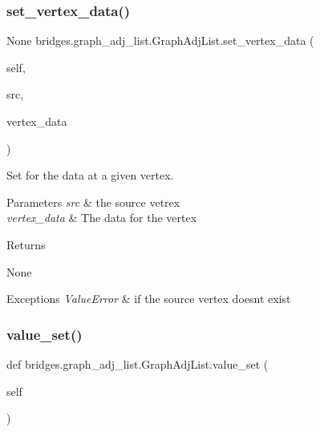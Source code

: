 \subsubsection{\texorpdfstring{set\_vertex\_data()}{set\_vertex\_data()}}
{\footnotesize\ttfamily  None bridges.\+graph\+\_\+adj\+\_\+list.\+Graph\+Adj\+List.\+set\+\_\+vertex\+\_\+data (\begin{DoxyParamCaption}\item[{}]{self,  }\item[{}]{src,  }\item[{}]{vertex\+\_\+data }\end{DoxyParamCaption})}



Set for the data at a given vertex. 


\begin{DoxyParams}{Parameters}
{\em src} & the source vetrex \\
\hline
{\em vertex\+\_\+data} & The data for the vertex \\
\hline
\end{DoxyParams}
\begin{DoxyReturn}{Returns}


None
\end{DoxyReturn}

\begin{DoxyExceptions}{Exceptions}
{\em Value\+Error} & if the source vertex doesnt exist \\
\hline
\end{DoxyExceptions}
\mbox{\label{classbridges_1_1graph__adj__list_1_1_graph_adj_list_ae12db7b48cf37ba8d2852fa05ebaa2c0}} 
\subsubsection{\texorpdfstring{value\_set()}{value\_set()}}
{\footnotesize\ttfamily def bridges.\+graph\+\_\+adj\+\_\+list.\+Graph\+Adj\+List.\+value\+\_\+set (\begin{DoxyParamCaption}\item[{}]{self }\end{DoxyParamCaption})}

\mbox{\label{classbridges_1_1graph__adj__list_1_1_graph_adj_list_afee0fb35ddd234d9c52998d0d62e1a5c}} 
